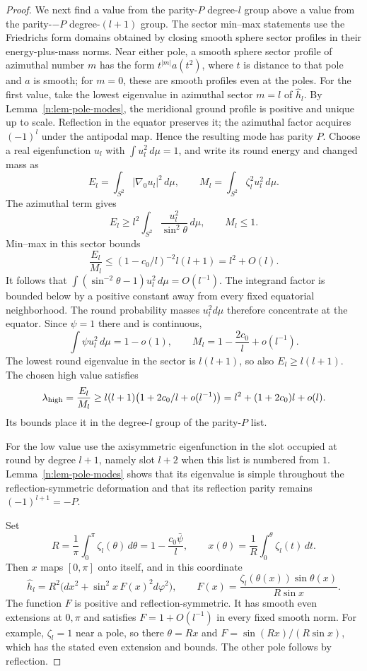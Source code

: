 \begin{proof}
We next find a value from the parity-\(P\) degree-\(l\) group above
a value from the parity-\(-P\) degree-\((l+1)\) group.  The sector
min--max statements use the Friedrichs form domains obtained by
closing smooth sphere sector profiles in their energy-plus-mass norms.
Near either pole, a smooth sphere sector profile of azimuthal number \(m\) has the form
\(t^{|m|}a(t^2)\), where \(t\) is distance to that pole and \(a\) is
smooth; for \(m=0\), these are smooth profiles even at the poles.
For the first value, take the lowest eigenvalue in azimuthal sector \(m=l\) of
\(\widehat h_l\).  By Lemma~\ref{n:lem-pole-modes}, the meridional ground profile is
positive and unique up to scale.  Reflection in the equator preserves it; the
azimuthal factor acquires \((-1)^l\) under the antipodal map.  Hence
the resulting mode has parity \(P\).  Choose a real eigenfunction
\(u_l\) with \(\int u_l^2\,d\mu=1\), and write its round energy and
changed mass as
\[
 E_l=\int_{S^2}|\nabla_0u_l|^2\,d\mu,\qquad
 M_l=\int_{S^2}\zeta_l^2u_l^2\,d\mu.
\]
The azimuthal term gives
\[
 E_l\geq l^2\int_{S^2}\frac{u_l^2}{\sin^2\theta}\,d\mu,
 \qquad M_l\leq1.
\]
Min--max in this sector bounds
\[
 \frac{E_l}{M_l}\leq(1-c_0/l)^{-2}l(l+1)=l^2+O(l).
\]
It follows that
\(\int(\sin^{-2}\theta-1)u_l^2\,d\mu=O(l^{-1})\).
The integrand factor is bounded below by a positive constant away
from every fixed equatorial neighborhood.  The round probability
masses \(u_l^2d\mu\) therefore concentrate at the equator.  Since
\(\psi=1\) there and is continuous,
\[
 \int\psi u_l^2\,d\mu=1-o(1),\qquad
 M_l=1-\frac{2c_0}{l}+o(l^{-1}).
\]
The lowest round eigenvalue in the sector is \(l(l+1)\), so also
\(E_l\geq l(l+1)\).  The chosen high value satisfies
\begin{equation}\label{n:eq-high-parity}
 \lambda_{\rm high}=\frac{E_l}{M_l}
 \geq l(l+1)\bigl(1+2c_0/l+o(l^{-1})\bigr)
 =l^2+(1+2c_0)l+o(l).
\end{equation}
Its bounds place it in the degree-\(l\) group of the parity-\(P\)
list.

For the low value use the axisymmetric eigenfunction in the slot
occupied at round by degree \(l+1\), namely slot \(l+2\) when this
list is numbered from \(1\).  Lemma~\ref{n:lem-pole-modes} shows that its eigenvalue is simple
throughout the reflection-symmetric deformation and that its reflection
parity remains $(-1)^{l+1}=-P$.

Set
\[
 R=\frac1\pi\int_0^\pi\zeta_l(\theta)\,d\theta
   =1-\frac{c_0\bar\psi}{l},\qquad
 x(\theta)=\frac1R\int_0^\theta\zeta_l(t)\,dt .
\]
Then \(x\) maps \([0,\pi]\) onto itself, and in this coordinate
\[
 \widehat h_l=R^2\bigl(dx^2+\sin^2x\,F(x)^2d\varphi^2\bigr),
 \qquad
 F(x)=\frac{\zeta_l(\theta(x))\sin\theta(x)}{R\sin x}.
\]
The function \(F\) is positive and reflection-symmetric.  It has
smooth even extensions at \(0,\pi\) and satisfies
\(F=1+O(l^{-1})\) in every fixed smooth norm.  For example,
\(\zeta_l=1\) near a pole, so there \(\theta=Rx\) and
\(F=\sin(Rx)/(R\sin x)\), which has the stated even extension and
bounds.  The other pole follows by reflection.


\end{proof}

